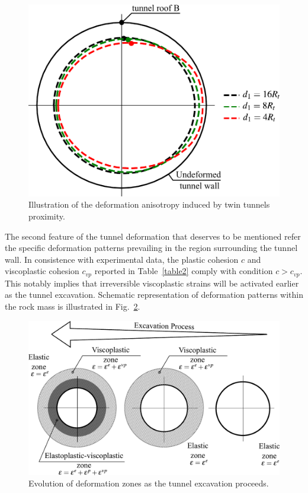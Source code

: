 \documentclass[Journal,letterpaper, NoLists,SectionNumbers]{ascelike-new}
\begin{document}
\begin{figure}[h!]
	\centering
	\includegraphics[scale=0.5]{Ovalization effect and monitoring point.pdf}
	\caption{Illustration of the deformation anisotropy induced by twin tunnels proximity.}
	\label{Ovalization effect and monitoring point}
\end{figure}

The second feature of the tunnel deformation that deserves to be mentioned refer the specific deformation patterns prevailing in the region surrounding the tunnel wall. In consistence with experimental data, the plastic cohesion $c$ and viscoplastic cohesion $c_{vp}$ reported in Table~\ref{table2} comply with condition  $c > c_{vp}$. This notably implies that irreversible viscoplastic strains will be activated earlier as the tunnel excavation. Schematic representation of deformation patterns within the rock mass is illustrated in Fig.~\ref{zones}.

\begin{figure}[h!]
	\centering
	\includegraphics[scale=0.6]{zones.pdf}
	\caption{Evolution of deformation zones as the tunnel excavation proceeds.}
	\label{zones}
\end{figure}
\end{document}
